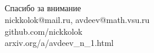 \documentclass[10pt,pdf,hyperref={unicode},aspectratio=169,color={usenames, dvipsnames}]{beamer}
\theoremstyle{definition}
\begin{document}




\begin{frame}
	{
		\huge\centering
		~\\~\\~\\~\\
		Спасибо за внимание
	}
	~\\
	\vspace{6.28em}
	nickkolok@mail.ru, avdeev@math.vsu.ru
	\\
	github.com/nickkolok
	\\
	arxiv.org/a/avdeev\_n\_1.html
	\label{slide:final}
\end{frame}












\end{document}
